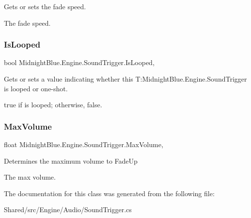 Gets or sets the fade speed. 

The fade speed.\hypertarget{class_midnight_blue_1_1_engine_1_1_sound_trigger_afbbf5dade4ec346ee419b00083b540b7}{}\label{class_midnight_blue_1_1_engine_1_1_sound_trigger_afbbf5dade4ec346ee419b00083b540b7} 
\subsubsection{\texorpdfstring{Is\+Looped}{IsLooped}}
{\footnotesize\ttfamily bool Midnight\+Blue.\+Engine.\+Sound\+Trigger.\+Is\+Looped\hspace{0.3cm}{\ttfamily [get]}, {\ttfamily [set]}}



Gets or sets a value indicating whether this T\+:\+Midnight\+Blue.\+Engine.\+Sound\+Trigger is looped or one-\/shot. 

{\ttfamily true} if is looped; otherwise, {\ttfamily false}.\hypertarget{class_midnight_blue_1_1_engine_1_1_sound_trigger_a06ed16768f70795a6b89e94deb89835b}{}\label{class_midnight_blue_1_1_engine_1_1_sound_trigger_a06ed16768f70795a6b89e94deb89835b} 
\subsubsection{\texorpdfstring{Max\+Volume}{MaxVolume}}
{\footnotesize\ttfamily float Midnight\+Blue.\+Engine.\+Sound\+Trigger.\+Max\+Volume\hspace{0.3cm}{\ttfamily [get]}, {\ttfamily [set]}}



Determines the maximum volume to Fade\+Up 

The max volume.

The documentation for this class was generated from the following file\+:\begin{DoxyCompactItemize}
\item 
Shared/src/\+Engine/\+Audio/Sound\+Trigger.\+cs\end{DoxyCompactItemize}
